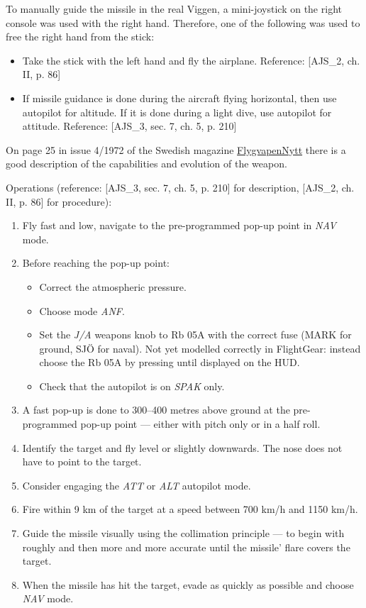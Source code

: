\documentclass[a4paper]{report}
\begin{document}
{To manually guide the missile in the real Viggen, a mini-joystick on the right console was used with the right hand. Therefore, one of the following was used to free the right hand from the stick:
\begin{itemize}
 \item Take the stick with the left hand and fly the airplane. Reference: [AJS\_2, ch. II, p. 86]
 \item If missile guidance is done during the aircraft flying horizontal, then use autopilot for altitude. If it is done during a light dive, use autopilot for attitude. Reference: [AJS\_3, sec. 7, ch. 5, p. 210]
\end{itemize}

On page 25 in issue 4/1972 of the Swedish magazine \href{https://www.aef.se/Flygvapnet/Tidskrifter/FV_Nytt/Flygvapennytt_1972-4.pdf}{FlygvapenNytt} there is a good description of the capabilities and evolution of the weapon.

Operations (reference: [AJS\_3, sec. 7, ch. 5, p. 210] for description, [AJS\_2, ch. II, p. 86] for procedure):
\begin{enumerate}
 \item Fly fast and low, navigate to the pre-programmed pop-up point in \emph{NAV} mode.
 \item Before reaching the pop-up point:
 \begin{itemize}
  \item Correct the atmospheric pressure.
  \item Choose mode \emph{ANF}.
  \item Set the \emph{J/A} weapons knob to Rb 05A with the correct fuse (MARK for ground, SJÖ for naval). Not yet modelled correctly in FlightGear: instead choose the Rb 05A by pressing  until displayed on the HUD.
  \item Check that the autopilot is on \emph{SPAK} only.
 \end{itemize}
 \item A fast pop-up is done to 300--400 metres above ground at the pre-programmed pop-up point --- either with pitch only or in a half roll.
 \item Identify the target and fly level or slightly downwards. The nose does not have to point to the target. 
 \item Consider engaging the \emph{ATT} or \emph{ALT} autopilot mode.
 \item Fire within 9 km of the target at a speed between 700 km/h and 1150 km/h.
 \item Guide the missile visually using the collimation principle --- to begin with roughly and then more and more accurate until the missile' flare covers the target.
 \item When the missile has hit the target, evade as quickly as possible and choose \emph{NAV} mode.
\end{enumerate}

}
\end{document}
